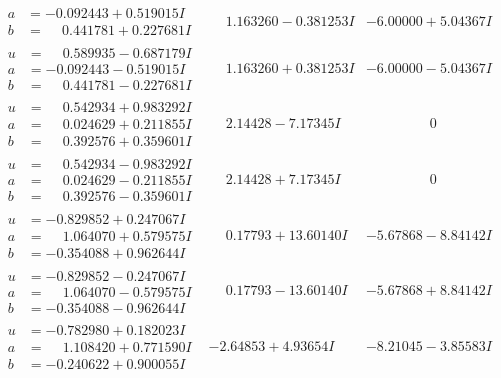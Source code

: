 \documentclass[1p]{elsarticle_modified}
\theoremstyle{definition}
\begin{document}
$$\begin{array}{c|c|c}
\begin{aligned}
a &= -0.092443 + 0.519015 I \\
b &= \phantom{-}0.441781 + 0.227681 I\end{aligned}
 & \phantom{-}1.163260 - 0.381253 I & -6.00000 + 5.04367 I \\ \hline\begin{aligned}
u &= \phantom{-}0.589935 - 0.687179 I \\
a &= -0.092443 - 0.519015 I \\
b &= \phantom{-}0.441781 - 0.227681 I\end{aligned}
 & \phantom{-}1.163260 + 0.381253 I & -6.00000 - 5.04367 I \\ \hline\begin{aligned}
u &= \phantom{-}0.542934 + 0.983292 I \\
a &= \phantom{-}0.024629 + 0.211855 I \\
b &= \phantom{-}0.392576 + 0.359601 I\end{aligned}
 & \phantom{-}2.14428 - 7.17345 I & \phantom{-0.000000 } 0 \\ \hline\begin{aligned}
u &= \phantom{-}0.542934 - 0.983292 I \\
a &= \phantom{-}0.024629 - 0.211855 I \\
b &= \phantom{-}0.392576 - 0.359601 I\end{aligned}
 & \phantom{-}2.14428 + 7.17345 I & \phantom{-0.000000 } 0 \\ \hline\begin{aligned}
u &= -0.829852 + 0.247067 I \\
a &= \phantom{-}1.064070 + 0.579575 I \\
b &= -0.354088 + 0.962644 I\end{aligned}
 & \phantom{-}0.17793 + 13.60140 I & -5.67868 - 8.84142 I \\ \hline\begin{aligned}
u &= -0.829852 - 0.247067 I \\
a &= \phantom{-}1.064070 - 0.579575 I \\
b &= -0.354088 - 0.962644 I\end{aligned}
 & \phantom{-}0.17793 - 13.60140 I & -5.67868 + 8.84142 I \\ \hline\begin{aligned}
u &= -0.782980 + 0.182023 I \\
a &= \phantom{-}1.108420 + 0.771590 I \\
b &= -0.240622 + 0.900055 I\end{aligned}
 & -2.64853 + 4.93654 I & -8.21045 - 3.85583 I \\ \hline\begin{aligned}

\end{aligned}
\end{array}$$
\end{document}
